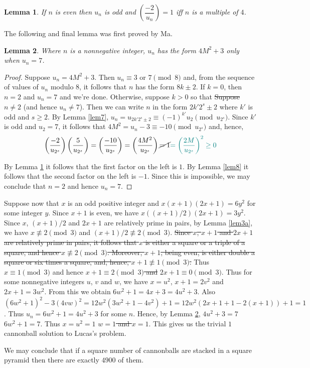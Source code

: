 \documentclass{article}
\newtheorem{lemma}{Lemma}
\numberwithin{lemma}{section}
\newcommand{\changed}[1]{{\color{teal} #1}}
\begin{document}
\begin{lemma}\label{lem9}
If $n$ is even then $u_n$ is odd and $\left(\dfrac{-2}{u_n}\right) = 1$ iff $n$ is a multiple of $4$.
\end{lemma}

The following and final lemma was first proved by Ma.

\begin{lemma}\label{lem10}
Where $n$ is a nonnegative integer, $u_n$ has the form $4M^2+3$ only when
$u_n = 7$.
\end{lemma}
\begin{proof}
Suppose $u_n = 4M^2+3$. Then $u_n \equiv 3$ or $7 \pmod 8$ and, from the sequence
of values of $u_n$ modulo $8$, it follows that $n$ has the form $8k \pm 2$. \changed{If $k = 0$, then $n = 2$ and $u_n = 7$ and we're done. Otherwise, suppose $k > 0$ so that} \sout{Suppose}
$n \ne 2$ (and hence $u_n \ne 7$). Then we can write $n$ in the form $2k' 2^s \pm 2$ where $k'$ is
odd and $s \ge 2$. By Lemma \ref{lem7}, $u_n = u_{2k' 2^s \pm 2} \equiv (-1)^{k'} u_2 \pmod{u_{2^s}}$. Since $k'$ is odd
and $u_2 = 7$, it follows that $4M^2 = u_n-3 \equiv -10 \pmod{u_{2^s}}$ and, hence,
$$\left(\dfrac{-2}{u_{2^s}}\right) \left(\dfrac{5}{u_{2^s}}\right)
= \left(\dfrac{-10}{u_{2^s}}\right)
= \left(\dfrac{4M^2}{u_{2^s}}\right)
\cancel{= 1}
\changed{= \left(\dfrac{2M}{u_{2^s}}\right)^2 \ge 0}$$

By Lemma \ref{lem9} it follows that the first factor on the left is $1$. By Lemma \ref{lem8} it follows
that the second factor on the left is $-1$. Since this is impossible, we may conclude
that $n = 2$ and hence $u_n = 7$.
\end{proof}

Suppose now that $x$ is an odd positive integer and $x(x+1)(2x+1) = 6y^2$ for
some integer $y$. \changed{Since $x+1$ is even, we have $x((x+1)/2)(2x+1) = 3y^2$. Since $x$, $(x+1)/2$ and $2x+1$ are relatively prime in pairs, by Lemma \ref{lem3a}, we have $x \not\equiv 2 \pmod 3$ and $(x+1)/2 \not\equiv 2 \pmod 3$.} \sout{Since $x$, $x+1$ and $2x+1$ are relatively prime in pairs, it follows
that $x$ is either a square or a triple of a square, and hence $x \not\equiv 2 \pmod 3$. Moreover,
$x+1$, being even, is either double a square or six times a square, and, hence,
$x+1 \not\equiv 1 \pmod 3$.} Thus $x \equiv 1 \pmod 3$ and hence \sout{$x+1 \equiv 2 \pmod 3$ and} $2x+1 \equiv 0 \pmod 3$.
Thus for some nonnegative integers $u$, $v$ and $w$, we have $x = u^2$,
$x+1 = 2v^2$ and $2x+1 = 3w^2$. From this we obtain $6w^2+1 = 4x+3 = 4u^2+3$.
Also $(6w^2+1)^2-3(4vw)^2 = 12w^2(3w^2+1-4v^2)+1 = 12w^2(2x+1+1-2(x+1))+1 = 1$. \changed{Thus $u_n = 6w^2+1 = 4u^2+3$ for some $n$.}
Hence, by Lemma \ref{lem10}, \changed{$4u^2+3 = 7$} \sout{$6w^2+1 = 7$}. Thus \changed{$x = u^2 = 1$} \sout{$w = 1$ and
$x = 1$}. This gives us the trivial $1$ cannonball solution to Lucas's problem.

We may conclude that if a square number of cannonballs are stacked in a square
pyramid then there are exactly $4900$ of them.
\end{document}
